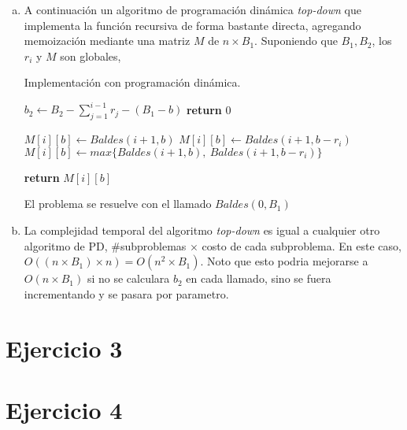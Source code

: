 \documentclass[12pt, a4paper]{report}
\theoremstyle{definition} %
\begin{document}
\begin{enumerate}[a)]
    \item A continuación un algoritmo de programación dinámica \textit{top-down} que implementa la función recursiva de forma bastante directa, agregando memoización mediante una matriz $M$ de $n \times B_1$. Suponiendo que $B_1, B_2$, los $r_i$ y $M$ son globales,
    
    \begin{algorithm}[H]
        \caption{Implementación con programación dinámica.}
        \begin{algorithmic}[1]
                \State $b_2\gets B_2 - \sum_{j=1}^{i-1} r_j - (B_1 - b)$ 
                    \State \textbf{return} 0
                \EndIf

                 
                        \State $M[i][b] \gets Baldes(i + 1, b)$
                        \State $M[i][b] \gets Baldes(i + 1, b - r_i)$
                    \Else
                        \State $M[i][b] \gets max\{Baldes(i+1, b),\ Baldes(i+1, b - r_i)\}$
                    \EndIf
                \EndIf

                \State \textbf{return} $M[i][b]$
            \EndFunction
        \end{algorithmic}
    \end{algorithm}
    
    El problema se resuelve con el llamado $Baldes(0, B_1)$

    \item La complejidad temporal del algoritmo \textit{top-down} es igual a cualquier otro algoritmo de PD, \#subproblemas $\times$ costo de cada subproblema. En este caso, $O((n \times B_1) \times n) = O(n^2 \times B_1)$. Noto que esto podria mejorarse a $O(n \times B_1)$ si no se calculara $b_2$ en cada llamado, sino se fuera incrementando y se pasara por parametro.
        
\end{enumerate}

\section*{Ejercicio 3}

\section*{Ejercicio 4}
\end{document}
